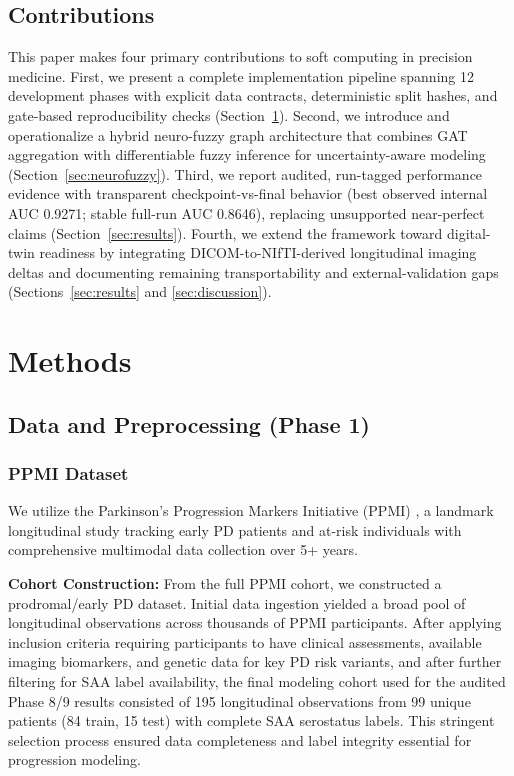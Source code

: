 \documentclass[journal,twoside,web]{ieeecolor}
\begin{document}
\subsection{Contributions}
This paper makes four primary contributions to soft computing in precision medicine. First, we present a complete implementation pipeline spanning 12 development phases with explicit data contracts, deterministic split hashes, and gate-based reproducibility checks (Section~\ref{sec:methods}). Second, we introduce and operationalize a hybrid neuro-fuzzy graph architecture that combines GAT aggregation with differentiable fuzzy inference for uncertainty-aware modeling (Section~\ref{sec:neurofuzzy}). Third, we report audited, run-tagged performance evidence with transparent checkpoint-vs-final behavior (best observed internal AUC 0.9271; stable full-run AUC 0.8646), replacing unsupported near-perfect claims (Section~\ref{sec:results}). Fourth, we extend the framework toward digital-twin readiness by integrating DICOM-to-NIfTI-derived longitudinal imaging deltas and documenting remaining transportability and external-validation gaps (Sections~\ref{sec:results} and \ref{sec:discussion}).

\section{Methods}
\label{sec:methods}

\subsection{Data and Preprocessing (Phase 1)}

\subsubsection{PPMI Dataset}
We utilize the Parkinson's Progression Markers Initiative (PPMI) \cite{marek2011ppmi}, a landmark longitudinal study tracking early PD patients and at-risk individuals with comprehensive multimodal data collection over 5+ years.

\textbf{Cohort Construction:} From the full PPMI cohort, we constructed a prodromal/early PD dataset. Initial data ingestion yielded a broad pool of longitudinal observations across thousands of PPMI participants. After applying inclusion criteria requiring participants to have clinical assessments, available imaging biomarkers, and genetic data for key PD risk variants, and after further filtering for SAA label availability, the final modeling cohort used for the audited Phase 8/9 results consisted of 195 longitudinal observations from 99 unique patients (84 train, 15 test) with complete SAA serostatus labels. This stringent selection process ensured data completeness and label integrity essential for progression modeling.
\end{document}
